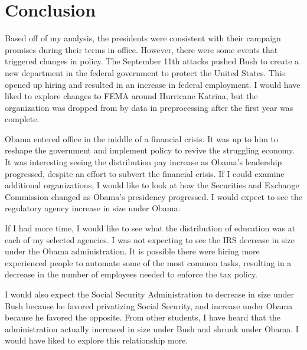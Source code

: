 \documentclass{article}
\begin{document}
\section{Conclusion}
Based off of my analysis, the presidents were consistent with their campaign promises during their terms in office. However, there were some events that triggered changes in policy. The September 11th attacks pushed Bush to create a new department in the federal government to protect the United States. This opened up hiring and resulted in an increase in federal employment. I would have liked to explore changes to FEMA around Hurricane Katrina, but the organization was dropped from by data in preprocessing after the first year was complete.
\par
Obama entered office in the middle of a financial crisis. It was up to him to reshape the government and implement policy to revive the struggling economy. It was interesting seeing the distribution pay increase as Obama's leadership progressed, despite an effort to subvert the financial crisis. If I could examine additional organizations, I would like to look at how the Securities and Exchange Commission changed as Obama's presidency progressed. I would expect to see the regulatory agency increase in size under Obama.
\par
If I had more time, I would like to see what the distribution of education was at each of my selected agencies. I was not expecting to see the IRS decrease in size under the Obama administration. It is possible there were hiring more experienced people to automate some of the most common tasks, resulting in a decrease in the number of employees needed to enforce the tax policy.
\par
I would also expect the Social Security Administration to decrease in size under Bush because he favored privatizing Social Security, and increase under Obama because he favored the opposite. From other students, I have heard that the administration actually increased in size under Bush and shrunk under Obama. I would have liked to explore this relationship more.

\newpage
\end{document}
